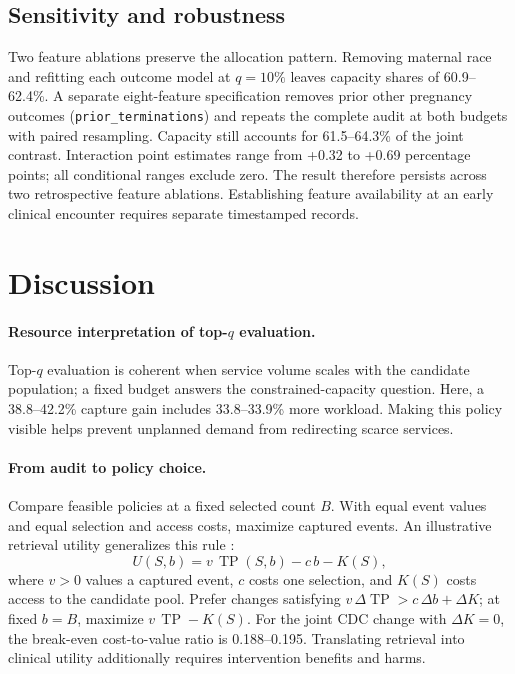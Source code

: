 \documentclass{article}
\begin{document}


\subsection{Sensitivity and robustness}
\label{sec:sensitivity}

Two feature ablations preserve the allocation pattern. Removing maternal race
and refitting each outcome model at $q=10\%$ leaves capacity shares of
60.9--62.4\%. A separate eight-feature specification removes prior other
pregnancy outcomes (\texttt{prior\_terminations}) and repeats the complete audit
at both budgets with paired resampling. Capacity still accounts for
61.5--64.3\% of the joint contrast. Interaction point estimates range from
+0.32 to +0.69 percentage points; all conditional ranges exclude zero.
The result therefore persists across
two retrospective feature ablations. Establishing feature availability at an
early clinical encounter requires separate timestamped records.

\FloatBarrier

\section{Discussion}
\label{sec:discussion}

\paragraph{Resource interpretation of top-$q$ evaluation.}
Top-$q$ evaluation is coherent when service volume scales with the candidate
population; a fixed budget answers the constrained-capacity question. Here,
a 38.8--42.2\% capture gain includes 33.8--33.9\% more workload. Making this policy
visible helps prevent unplanned demand from redirecting scarce services.

\paragraph{From audit to policy choice.}
Compare feasible policies at a fixed selected count $B$. With equal event
values and equal selection and access costs, maximize captured events.
An illustrative retrieval utility generalizes this rule
\citep{singh2023resource}:
\begin{equation}
 U(S,b)=v\,\operatorname{TP}(S,b)-c\,b-K(S),
 \label{eq:utility}
\end{equation}
where $v>0$ values a captured event, $c$ costs one selection, and $K(S)$ costs
access to the candidate pool. Prefer changes satisfying
$v\,\Delta\operatorname{TP}>c\,\Delta b+\Delta K$; at fixed $b=B$, maximize
$v\,\operatorname{TP}-K(S)$. For the joint CDC change with $\Delta K=0$,
the break-even cost-to-value ratio is 0.188--0.195. Translating retrieval into
clinical utility additionally requires intervention benefits and harms.
\end{document}
